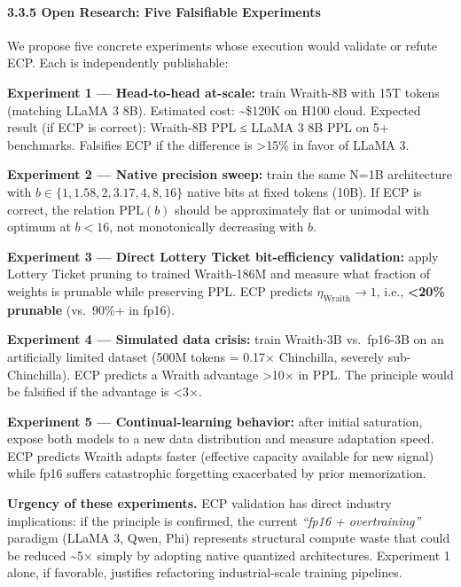 \paragraph{3.3.5 Open Research: Five Falsifiable
Experiments}\label{open-research-five-falsifiable-experiments}

We propose five concrete experiments whose execution would validate or
refute ECP. Each is independently publishable:

\textbf{Experiment 1 --- Head-to-head at-scale:} train Wraith-8B with
15T tokens (matching LLaMA 3 8B). Estimated cost: \textasciitilde\$120K
on H100 cloud. Expected result (if ECP is correct): Wraith-8B PPL ≤
LLaMA 3 8B PPL on 5+ benchmarks. Falsifies ECP if the difference is
\textgreater15\% in favor of LLaMA 3.

\textbf{Experiment 2 --- Native precision sweep:} train the same N=1B
architecture with \(b \in \{1, 1.58, 2, 3.17, 4, 8, 16\}\) native bits
at fixed tokens (10B). If ECP is correct, the relation \(\text{PPL}(b)\)
should be approximately flat or unimodal with optimum at \(b < 16\), not
monotonically decreasing with \(b\).

\textbf{Experiment 3 --- Direct Lottery Ticket bit-efficiency
validation:} apply Lottery Ticket pruning to trained Wraith-186M and
measure what fraction of weights is prunable while preserving PPL. ECP
predicts \(\eta_\text{Wraith} \to 1\), i.e., \textbf{\textless20\%
prunable} (vs.~90\%+ in fp16).

\textbf{Experiment 4 --- Simulated data crisis:} train Wraith-3B
vs.~fp16-3B on an artificially limited dataset (500M tokens = 0.17×
Chinchilla, severely sub-Chinchilla). ECP predicts a Wraith advantage
\textgreater10× in PPL. The principle would be falsified if the
advantage is \textless3×.

\textbf{Experiment 5 --- Continual-learning behavior:} after initial
saturation, expose both models to a new data distribution and measure
adaptation speed. ECP predicts Wraith adapts faster (effective capacity
available for new signal) while fp16 suffers catastrophic forgetting
exacerbated by prior memorization.

\textbf{Urgency of these experiments.} ECP validation has direct
industry implications: if the principle is confirmed, the current
\emph{``fp16 + overtraining''} paradigm (LLaMA 3, Qwen, Phi) represents
structural compute waste that could be reduced \textasciitilde5× simply
by adopting native quantized architectures. Experiment 1 alone, if
favorable, justifies refactoring industrial-scale training pipelines.

